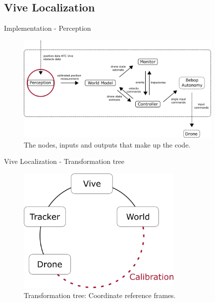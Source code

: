 \subsection{Vive Localization}
\label{subsec:Vive}

\begin{frame}{Implementation - Perception}

    \begin{figure}[h]
    \centering
    \includegraphics[width=10cm]{Figures/code_structure_perception.png}
    \caption{The nodes, inputs and outputs that make up the code.}
    \label{fig:code_struct}
    \end{figure}
    		
\end{frame}

\begin{frame}{Vive Localization - Transformation tree}

    \begin{figure}[h]
    \centering
    \includegraphics[width=8cm]{Figures/coordinate_frames.png}
    \caption{Transformation tree: Coordinate reference frames.}
    \label{fig:coord_frame}
    \end{figure}
    		
\end{frame}